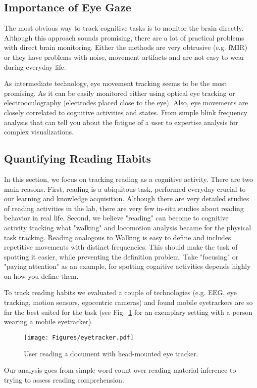 \documentclass[journal]{IEEEtran}
\begin{document}
\begin{figure*}
\subsection{Importance of Eye Gaze}
The most obvious way to track cognitive tasks is to monitor the brain directly. 
Although this approach sounds promising, there are a lot of practical problems with direct brain monitoring. 
Either the methods are very obtrusive (e.g. fMIR) or they have problems with noise, movement artifacts and are not easy to wear during everyday life.

As intermediate technology, eye movement tracking seems to be the most promising. 
As it can be easily monitored either using optical eye tracking or electrooculography (electrodes placed close to the eye). 
Also, eye movements are closely correlated to cognitive activities and states.
From simple blink frequency analysis that can tell you about the fatigue of a user to expertise analysis for complex visualizations. 

\subsection{Quantifying Reading Habits}
In this section, we focus on tracking reading as a cognitive activity. 
There are two main reasons. 
First, reading is a ubiquitous task, performed everyday crucial to our learning and knowledge acquisition. 
Although there are very detailed studies of reading activities in the lab, there are very few in-situ studies about reading behavior in real life. 
Second, we believe "reading" can become to cognitive activity tracking what "walking" and locomotion analysis became for the physical task tracking. 
Reading analogous to Walking is easy to define and includes repetitive movements with distinct frequencies. 
This should make the task of spotting it easier, while preventing the definition problem. 
Take "focusing" or "paying attention" as an example, for spotting cognitive activities depends highly on how you define them. 

To track reading habits we evaluated a couple of technologies (e.g. EEG, eye tracking, motion sensors, egocentric cameras) and found mobile eyetrackers are so far the best suited for the task (see Fig.~\ref{eyetracker} for an exemplary setting with a person wearing a mobile eyetracker). 
\begin{figure}
    \texttt{[image: Figures/eyetracker.pdf]}
   \caption{User reading a document with head-mounted eye tracker.}
   \label{eyetracker}
\end{figure}
Our analysis goes from simple word count over reading material inference to trying to assess reading comprehension.


\end{figure*}
\end{document}
